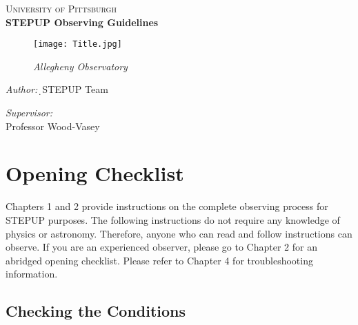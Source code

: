 \documentclass[11pt]{report}
\begin{document}
\begin{titlepage}
\begin{center}
\textsc{\LARGE University of Pittsburgh}\\[1.5cm]
{ \huge \bfseries STEPUP Observing Guidelines\\[0.4cm] }


\begin{figure}[!h]
\begin{center}
\texttt{[image: Title.jpg]}
\end{center}
\begin{center}
\emph{Allegheny Observatory}
\end{center}
\end{figure}

\vfill
\begin{minipage}{0.4\textwidth}
\begin{flushleft} \large
\emph{Author:}\d\
STEPUP Team
\end{flushleft}
\end{minipage}
\begin{minipage}{0.4\textwidth}
\begin{flushright} \large
\emph{Supervisor:} \\
Professor Wood-Vasey
\end{flushright}
\end{minipage}

\end{center}
\end{titlepage}
\tableofcontents
\chapter{Opening Checklist}

Chapters 1 and 2 provide instructions on the complete observing process for STEPUP purposes. The following instructions do not require any knowledge of physics or astronomy. Therefore, anyone who can read and follow instructions can observe. If you are an experienced observer, please go to Chapter 2 for an abridged opening checklist. Please refer to Chapter 4 for troubleshooting information.

\section{Checking the Conditions}
\end{document}

